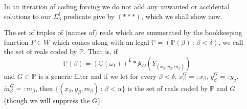 \documentclass[a4paper,11pt]{article}
\newcommand{\forceP}{\mathbb{P}}
\begin{document}
In an iteration of coding forcing we do not add any unwanted or accidental solutions to our $\Sigma^1_3$ predicate give by $({\ast} {\ast} {\ast})$, which we shall show now.

The set of triples of (names of) reals which are enumerated by the bookkeeping function $F \in W$ which comes along with an legal $\forceP = (\forceP(\beta) \, : \, \beta < \delta)$, we call the set of reals coded by $\forceP$. That is, if \[ \forceP(\beta)= (\mathbb{C}(\omega_1))^L \ast \dot{\mathbb{A}}_D (\dot{Y}_{(\dot{x}_{\beta}, \dot{y}_{\beta}, \dot{m}_{\beta} ) } ) \] and $G \subset \forceP$ is a generic filter and if we let for every $\beta < \delta$,
$ \dot{x}_{\beta}^G =:x_{\beta}$, $\dot{y}_{\beta}^G =:y_{\beta}$, $\dot{m}_{\beta}^G =:m_{\beta}$,  then
$\{ (x_{\beta},y_{\beta},m_{\beta} ) \, : \, \beta < \alpha \}$ is the set of reals coded by $\forceP$ and $G$ (though we will suppress the $G$).
\end{document}

